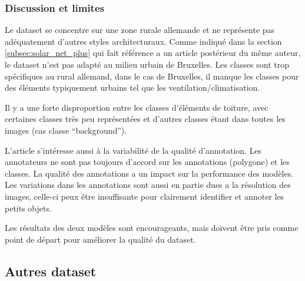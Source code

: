 \subsubsection{Discussion et limites}
\par{Le dataset se concentre sur une zone rurale allemande et ne représente pas adéquatement d'autres styles architecturaux. Comme indiqué dans la section \ref{subsec:solar_net_plus} qui fait référence a un article postérieur du même auteur, le dataset n'est pas adapté au milieu urbain de Bruxelles. Les classes sont trop spécifiques au rural allemand, dans le cas de Bruxelles, il manque les classes pour des éléments typiquement urbains tel que les ventilation/climatisation.}
\par{Il y a une forte disproportion entre les classes d'éléments de toiture, avec certaines classes très peu représentées et d'autres classes étant dans toutes les images (cas classe ``background'').}
\par{L'article s'intéresse aussi à la variabilité de la qualité d'annotation. Les annotateurs ne sont pas toujours d'accord sur les annotations (polygone) et les classes. La qualité des annotations a un impact sur la performance des modèles. Les variations dans les annotations sont aussi en partie dues a la résolution des images, celle-ci peux être insuffisante pour clairement identifier et annoter les petits objets.}
\par{Les résultats des deux modèles sont encourageants, mais doivent être pris comme point de départ pour améliorer la qualité du dataset.}

\subsection{Autres dataset}

